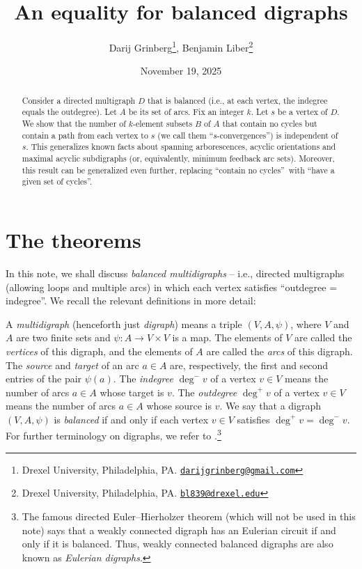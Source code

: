 \documentclass[numbers=enddot,12pt,final,onecolumn,notitlepage]{scrartcl}%
\theoremstyle{definition}
\theoremstyle{plainsl}
\begin{document}
\title{An equality for balanced digraphs}
\author{Darij Grinberg\thanks{Drexel University, Philadelphia, PA.
\href{mailto:darijgrinberg@gmail.com}{\texttt{darijgrinberg@gmail.com}}},
Benjamin Liber\thanks{Drexel University, Philadelphia, PA.
\href{mailto:bl839@drexel.edu}{\texttt{bl839@drexel.edu}}}}
\date{November 19, 2025}
\maketitle

\begin{abstract}
Consider a directed multigraph $D$ that is balanced (i.e., at each vertex, the
indegree equals the outdegree). Let $A$ be its set of arcs. Fix an integer
$k$. Let $s$ be a vertex of $D$. We show that the number of $k$-element
subsets $B$ of $A$ that contain no cycles but contain a path from each vertex
to $s$ (we call them \textquotedblleft$s$-convergences\textquotedblright) is
independent of $s$. This generalizes known facts about spanning arborescences,
acyclic orientations and maximal acyclic subdigraphs (or, equivalently,
minimum feedback arc sets). Moreover, this result can be generalized even
further, replacing \textquotedblleft contain no cycles\textquotedblright\ with
\textquotedblleft have a given set of cycles\textquotedblright.

\end{abstract}

\section{The theorems}

In this note, we shall discuss \emph{balanced multidigraphs} -- i.e., directed
multigraphs (allowing loops and multiple arcs) in which each vertex satisfies
\textquotedblleft outdegree = indegree\textquotedblright. We recall the
relevant definitions in more detail:

A \emph{multidigraph} (henceforth just \emph{digraph}) means a triple
$(V,A,\psi)$, where $V$ and $A$ are two finite sets and $\psi:A\rightarrow
V\times V$ is a map. The elements of $V$ are called the \emph{vertices} of
this digraph, and the elements of $A$ are called the \emph{arcs} of this
digraph. The \emph{source} and \emph{target} of an arc $a\in A$ are,
respectively, the first and second entries of the pair $\psi(a)$. The
\emph{indegree} $\deg^{-}v$ of a vertex $v\in V$ means the number of arcs
$a\in A$ whose target is $v$. The \emph{outdegree} $\deg^{+}v$ of a vertex
$v\in V$ means the number of arcs $a\in A$ whose source is $v$. We say that a
digraph $(V,A,\psi)$ is \emph{balanced} if and only if each vertex $v\in V$
satisfies $\deg^{+}v=\deg^{-}v$. For further terminology on digraphs, we refer
to \cite{22s}.\footnote{The famous directed Euler--Hierholzer theorem (which
will not be used in this note) says that a weakly connected digraph has an
Eulerian circuit if and only if it is balanced. Thus, weakly connected
balanced digraphs are also known as \emph{Eulerian digraphs}.}
\end{document}
